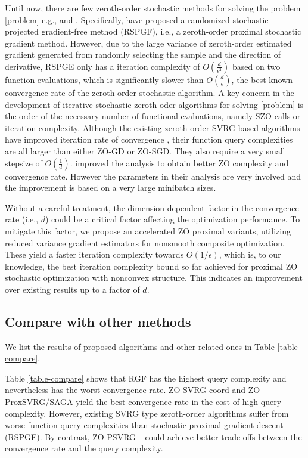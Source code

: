 \documentclass{article}
\theoremstyle{definition}
\theoremstyle{remark}
\begin{document}
{\color{Green}  Until now, there are few zeroth-order stochastic methods
for solving the problem \eqref{problem} e.g., \cite{ghadimi2016accelerated} and \cite{huang2019faster}. Specifically, \cite{ghadimi2016accelerated} have proposed a randomized stochastic projected gradient-free method (RSPGF),
i.e., a zeroth-order proximal stochastic gradient method. However, due to the large variance of zeroth-order estimated gradient generated from randomly selecting the sample and the direction of derivative, RSPGE only has a iteration complexity of  $O(\frac{d}{\epsilon^2})$ based on two function evaluations, which is significantly slower than $O(\frac{d}{{\epsilon}})$,
the best known convergence rate of the zeroth-order stochastic algorithm. 
{\color{RubineRed}
A key concern in the development of iterative stochastic zeroth-oder algorithms for solving  \eqref{problem} is the order of the necessary number of functional evaluations, namely SZO calls or iteration complexity.
}
{\color{YellowOrange}
Although the existing zeroth-order SVRG-based algorithms have improved iteration rate of convergence
, their function query complexities are all larger than either ZO-GD or ZO-SGD. They also require a very small stepsize of $O(\frac{1}{d})$.  \cite{ji2019improved} improved the analysis to obtain better ZO complexity and convergence rate. However the parameters in their analysis are very involved and the improvement is based on a very large minibatch sizes.
}
{\color{Brown}
 Without a
careful treatment, the dimension dependent factor in the convergence rate (i.e., $d$) could be a critical factor affecting
the optimization performance. To mitigate this factor, we propose an accelerated ZO proximal  variants, utilizing reduced variance gradient estimators for nonsmooth composite optimization. These yield a faster iteration complexity towards $O(1/\epsilon )$, which is, to our knowledge, the best iteration complexity bound so far achieved for proximal ZO stochastic optimization with nonconvex structure.
{\color{RubineRed} This indicates an improvement over existing results up to a factor of ${d}$.}

}
}

\subsection{Compare with other methods}
{\color{Violet}
We list the results of proposed algorithms and other related ones in Table \ref{table-compare}.
}
{\color{Brown}

Table \ref{table-compare} shows
that RGF has the highest query complexity and nevertheless has the worst convergence rate. ZO-SVRG-coord
and ZO-ProxSVRG/SAGA yield the best convergence rate in the cost of high query complexity. {\color{YellowOrange} However, existing SVRG type zeroth-order algorithms suffer from worse
function query complexities than stochastic proximal gradient descent (RSPGF).} By contrast, ZO-PSVRG+ could achieve better trade-offs between the
convergence rate and the query complexity.
}
\end{document}
